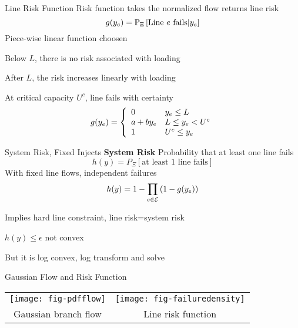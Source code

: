 \begin{frame}{Line Risk Function}
Risk function takes the normalized flow returns line risk 
\begin{equation*}
 g(y_e) = \mathbb{P}_{\Xi} \left[ \text{Line }e\text{ fails} | y_e \right] 
\end{equation*}
\pause
Piece-wise linear function choosen
\bi
\item Below $L$, there is no risk associated with loading
\item After $L$, the risk increases linearly with loading
\item At critical capacity $U^c$, line fails with certainty
\ei
\pause
\begin{equation*}
g(y_e) = \left\{ \begin{array}{l l}
  0 & y_e \leq L \\
  a + b y_e & L \leq y_e < U^c \\
  1 & U^c \leq y_e 
\end{array}
\right.
\end{equation*}
\end{frame}


\begin{frame}{System Risk, Fixed Injects}
\textbf{System Risk} Probability that at least one line fails
\begin{equation*}
 h(y) = P_\Xi \left[ \mbox{at least 1 line fails} \right] 
\end{equation*}
\pause
With fixed line flows, independent failures
\begin{equation*}  
h(y) = 1 - \prod_{e \in {\cal E}} \left( 1 - g(y_e) \right)
\end{equation*}  
\pause
\bi
\item Implies hard line constraint, line risk=system risk
\item $h(y) \leq \epsilon$ not convex
\bi
\item But it is log convex, log transform and solve
\ei
\ei

\end{frame}

\begin{frame}{Gaussian Flow and Risk Function}
\begin{center}
\begin{tabular}{c c}
\texttt{[image: fig-pdfflow]}
&
\texttt{[image: fig-failuredensity]}\\
\hspace{10pt}Gaussian branch flow & \hspace{10pt}Line risk function 
\end{tabular}
\end{center}
\end{frame}



